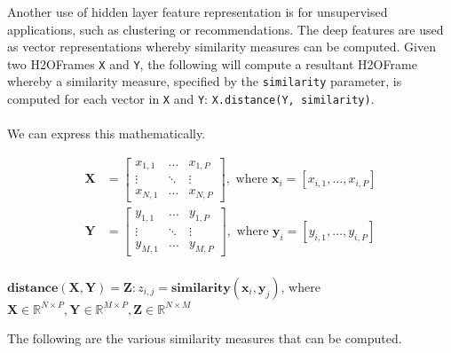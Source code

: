 \waterExampleInPython




Another use of hidden layer feature representation is for unsupervised applications, such as clustering or recommendations.  The deep features are used as vector representations whereby similarity measures can be computed.  Given two H2OFrames \texttt{X} and \texttt{Y}, the following will compute a resultant H2OFrame whereby a similarity measure, specified by the \texttt{similarity} parameter, is computed for each vector in \texttt{X} and \texttt{Y}: \texttt{X.distance(Y, similarity)}.\\
\\
We can express this mathematically.

\begin{equation*}
\begin{aligned}
	\mathbf{X} &=
		\begin{bmatrix}
			x_{1,1}	&	\dots	&	x_{1,P}\\
			\vdots	&	\ddots	&	\vdots\\
			x_{N,1}	&	\dots	&	x_{N,P}
		\end{bmatrix}, \text{ where } \mathbf{x}_i = [x_{i,1}, \dots, x_{i,P}]\\
	\mathbf{Y} &= \begin{bmatrix}
		y_{1,1}	&	\dots	&	y_{1,P}\\
		\vdots	&	\ddots	&	\vdots\\
		y_{M,1}	&	\dots	&	y_{M,P}
	\end{bmatrix}, \text{ where } \mathbf{y}_i = [y_{i,1}, \dots, y_{i,P}]\\
\end{aligned}
\end{equation*}


$\mathbf{distance}\left(\mathbf{X}, \mathbf{Y}\right) = \mathbf{Z} : z_{i,j} = \mathbf{similarity}\left(\mathbf{x}_i,\mathbf{y}_j\right)$, where $\mathbf{X} \in \mathbb{R}^{N \times P}, \mathbf{Y} \in \mathbb{R}^{M \times P}, \mathbf{Z} \in \mathbb{R}^{N \times M}$

\newpage
The following are the various similarity measures that can be computed.

